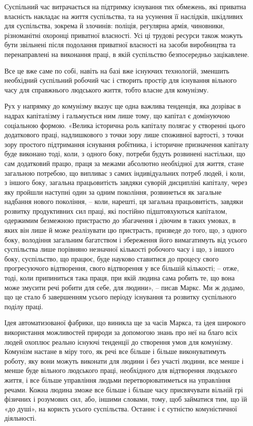 \documentclass[../main]{subfiles}
\begin{document}
Суспільний час витрачається на підтримку існування тих обмежень, які приватна власність накладає на життя суспільства, та на усунення її наслідків, шкідливих для суспільства, зокрема й злочинів: поліція, регулярна армія, чиновники, різноманітні охоронці приватної власності. Усі ці трудові ресурси також можуть бути звільнені після подолання приватної власності на засоби виробництва та перенаправлені на виконання праці, в якій суспільство безпосередньо зацікавлене.

Все це вже саме по собі, навіть на базі вже існуючих технологій, зменшить необхідний суспільний робочий час і створить простір для існування вільного часу для справжнього людського життя, тобто власне для комунізму.

Рух у напрямку до комунізму вказує ще одна важлива тенденція, яка дозріває в надрах капіталізму і гальмується ним лише тому, що капітал є домінуючою соціальною формою. «Велика історична роль капіталу полягає у створенні цього додаткового праці, надлишкового з точки зору лише споживної вартості, з точки зору простого підтримання існування робітника, і історичне призначення капіталу буде виконано тоді, коли, з одного боку, потреби будуть розвинені настільки, що сам додатковий працю, праця за межами абсолютно необхідної для життя, стане загальною потребою, що випливає з самих індивідуальних потреб людей, і коли, з іншого боку, загальна працьовитість завдяки суворій дисципліні капіталу, через яку пройшли наступні один за одним покоління, розвинеться як загальне надбання нового покоління, – коли, нарешті, ця загальна працьовитість, завдяки розвитку продуктивних сил праці, які постійно підштовхуються капіталом, одержимим безмежною пристрастю до збагачення і діючим в таких умовах, в яких він лише й може реалізувати цю пристрасть, призведе до того, що, з одного боку, володіння загальним багатством і збереження його вимагатимуть від усього суспільства лише порівняно незначної кількості робочого часу і що, з іншого боку, суспільство, що працює, буде науково ставитися до процесу свого прогресуючого відтворення, свого відтворення у все більшій кількості; – отже, тоді, коли припиниться така праця, при якій людина сама робить те, що вона може змусити речі робити для себе, для людини», – писав Маркс. Ми ж додамо, що це стало б завершенням усього періоду існування та розвитку суспільного поділу праці.

Ідея автоматизованої фабрики, що виникла ще за часів Маркса, та ідея широкого використання можливостей природи за допомогою знань про неї на благо всіх людей охоплює реально існуючі тенденції до створення умов для комунізму. Комунізм настане в міру того, як речі все більше і більше виконуватимуть роботу, яку вони можуть виконати для людини і без участі людини, все менше і менше буде вільного людського праці, необхідного для відтворення людського життя, і все більше управління людьми перетворюватиметься на управління речами. Кожна людина зможе все більше і більше часу присвячувати вільній грі фізичних і розумових сил, або, іншими словами, тому, щоб займатися тим, що їй «до душі», на користь усього суспільства. Останнє і є сутністю комуністичної діяльності.
\end{document}
